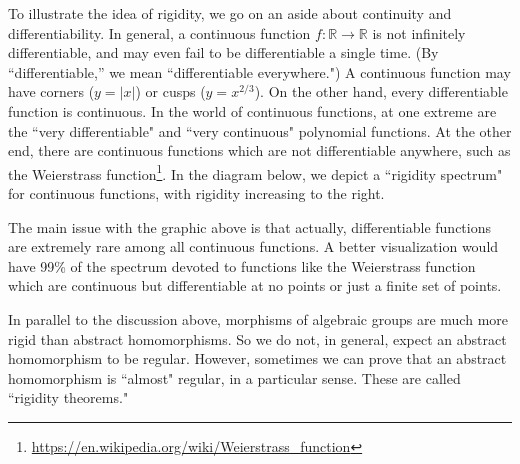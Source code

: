\documentclass[12pt]{article}
\theoremstyle{definition}
\newcommand{\R}{\mathbb{R}}
\begin{document}
To illustrate the idea of rigidity, we go on an aside about continuity and differentiability. In general, a continuous function $f:\R \to \R$ is not infinitely differentiable, and may even fail to be differentiable a single time. (By ``differentiable,'' we mean ``differentiable everywhere.") A continuous function may have corners ($y=|x|$) or cusps ($y=x^{2/3}$). On the other hand, every differentiable function is continuous. In the world of continuous functions, at one extreme are the ``very differentiable" and ``very continuous" polynomial functions. At the other end, there are continuous functions which are not differentiable anywhere, such as the Weierstrass function\footnote{\url{https://en.wikipedia.org/wiki/Weierstrass_function}}. In the diagram below, we depict a ``rigidity spectrum" for continuous functions, with rigidity increasing to the right.

\begin{center}
\end{center}
The main issue with the graphic above is that actually, differentiable functions are extremely rare among all continuous functions. A better visualization would have 99\% of the spectrum devoted to functions like the Weierstrass function which are continuous but differentiable at no points or just a finite set of points.

In parallel to the discussion above, morphisms of algebraic groups are much more rigid than abstract homomorphisms. So we do not, in general, expect an abstract homomorphism to be regular. However, sometimes we can prove that an abstract homomorphism is ``almost" regular, in a particular sense. These are called ``rigidity theorems."
\end{document}
